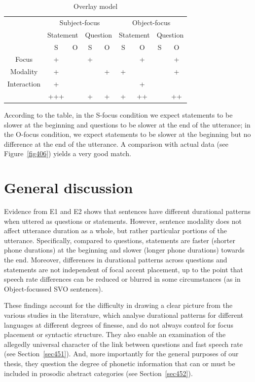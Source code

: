 \begin{table}[h]
\centering
\begin{tabular}{c || c c | c c || c c | c c}
& \multicolumn{4}{c}{Subject-focus} & \multicolumn{4}{c}{Object-focus}\\
& \multicolumn{2}{c}{Statement} & \multicolumn{2}{c}{Question} & \multicolumn{2}{c}{Statement} & \multicolumn{2}{c}{Question}\\
& S & O & S & O & S & O & S & O\\
\hline
Focus & + &   & + &   &   & + &   & + \\
Modality & + &   &   & + & + &   &   & + \\
Interaction & + &   &   &   &   & + &   &  \\
\hline
& +++ & & + & + & + & ++ & & ++ \\
\end{tabular}
\caption{Overlay model}
\label{tab43}\end{table}

According to the table, in the S-focus condition we expect statements to be slower at the beginning and questions to be slower at the end of the utterance; in the O-focus condition, we expect statements to be slower at the beginning but no difference at the end of the utterance. A comparison with actual data (see Figure~\ref{fig406}) yields a very good match.

\section{General discussion}\label{sec45}
Evidence from E1 and E2 shows that sentences have different durational patterns when uttered as questions or statements. However, sentence modality does not affect utterance duration as a whole, but rather particular portions of the utterance. Specifically, compared to questions, statements are faster (shorter phone durations) at the beginning and slower (longer phone durations) towards the end. Moreover, differences in durational patterns across questions and statements are not independent of focal accent placement, up to the point that speech rate differences can be reduced or blurred in some circumstances (as in Object-focussed SVO sentences). 

These findings account for the difficulty in drawing a clear picture from the various studies in the literature, which analyse durational patterns for different languages at different degrees of finesse, and do not always control for focus placement or syntactic structure. They also enable an examination of the allegedly universal character of the link between questions and fast speech rate (see Section~\ref{sec451}). And, more importantly for the general purposes of our thesis, they question the degree of phonetic information that can or must be included in prosodic abstract categories (see Section~\ref{sec452}).

